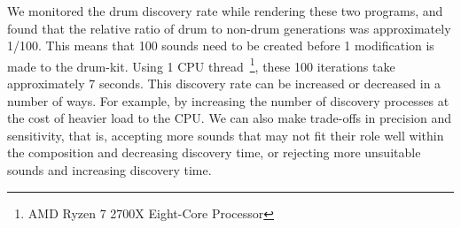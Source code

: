 \documentclass[\main/thesis.tex]{subfiles}
\begin{document}
  We monitored the drum discovery rate while rendering these two programs, and found that the relative ratio of drum to non-drum generations was approximately 1/100. This means that 100 sounds need to be created before 1 modification is made to the drum-kit. Using 1 CPU thread~\footnote{AMD Ryzen 7 2700X Eight-Core Processor}, these 100 iterations take approximately 7 seconds. This discovery rate can be increased or decreased in a number of ways. For example, by increasing the number of discovery processes at the cost of heavier load to the CPU. We can also make trade-offs in precision and sensitivity, that is, accepting more sounds that may not fit their role well within the composition and decreasing discovery time, or rejecting more unsuitable sounds and increasing discovery time. 

\begin{table}[tbp]
\caption{\label{tab:drum_prog} Parameters for each drum program.}
\end{table}
\end{document}
